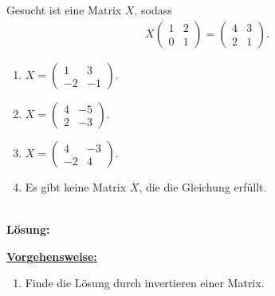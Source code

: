 \subsection*{}
Gesucht ist eine Matrix $ X $, sodass
\begin{align*}
X
\begin{pmatrix}
1 & 2 \\
0 & 1 
\end{pmatrix}
=
\begin{pmatrix}
4 & 3 \\
2 & 1
\end{pmatrix}
.
\end{align*}
\renewcommand{\labelenumi}{(\alph{enumi})}
\begin{enumerate}
	\item 
	$X
	= 
	\begin{pmatrix}
	1 & 3  \\
	-2 & -1 
	\end{pmatrix}$.
	\item
	$X
	= 
	\begin{pmatrix}
	4 &-5  \\
	2 & -3 
	\end{pmatrix}$.
	\item
	$X
	= 
	\begin{pmatrix}
	4 &-3  \\
	-2 & 4 
	\end{pmatrix}$.
	\item
	Es gibt keine Matrix $ X $, die die Gleichung erfüllt.
\end{enumerate}
\ \\
\textbf{Lösung:}
\begin{mdframed}
\underline{\textbf{Vorgehensweise:}}
\renewcommand{\labelenumi}{\theenumi.}
\begin{enumerate}
\item Finde die Lösung durch invertieren einer Matrix.

\end{enumerate}
\end{mdframed}

